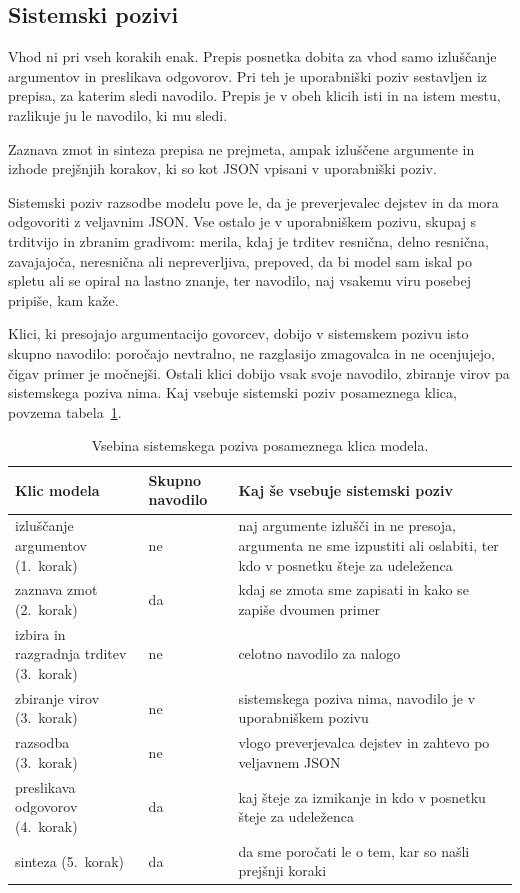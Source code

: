 \documentclass[a4paper, 12pt]{book}
\begin{document}
\subsection{Sistemski pozivi}
\label{ssec:sistemski-poziv}

Vhod ni pri vseh korakih enak. Prepis posnetka dobita za vhod samo izluščanje argumentov in preslikava odgovorov. Pri teh je uporabniški poziv sestavljen iz prepisa, za katerim sledi navodilo. Prepis je v obeh klicih isti in na istem mestu, razlikuje ju le navodilo, ki mu sledi.

Zaznava zmot in sinteza prepisa ne prejmeta, ampak izluščene argumente in izhode prejšnjih korakov, ki so kot JSON vpisani v uporabniški poziv. 

Sistemski poziv razsodbe modelu pove le, da je preverjevalec dejstev in da mora odgovoriti z veljavnim JSON. Vse ostalo je v uporabniškem pozivu, skupaj s trditvijo in zbranim gradivom: merila, kdaj je trditev resnična, delno resnična, zavajajoča, neresnična ali nepreverljiva, prepoved, da bi model sam iskal po spletu ali se opiral na lastno znanje, ter navodilo, naj vsakemu viru posebej pripiše, kam kaže.

Klici, ki presojajo argumentacijo govorcev, dobijo v sistemskem pozivu isto skupno navodilo: poročajo nevtralno, ne razglasijo zmagovalca in ne ocenjujejo, čigav primer je močnejši. Ostali klici dobijo vsak svoje navodilo, zbiranje virov pa sistemskega poziva nima. Kaj vsebuje sistemski poziv posameznega klica, povzema tabela~\ref{tbl:hisna}.

\begin{table}[H]
\centering
\small
{}
\begin{tabular}{@{}p{}p{}p{}@{}}
\toprule
Klic modela & Skupno navodilo & Kaj še vsebuje sistemski poziv \\
\midrule
izluščanje argumentov (1.~korak) & ne & naj argumente izlušči in ne presoja, argumenta ne sme izpustiti ali oslabiti, ter kdo v posnetku šteje za udeleženca \\
\midrule
zaznava zmot (2.~korak) & da & kdaj se zmota sme zapisati in kako se zapiše dvoumen primer \\
\midrule
izbira in razgradnja trditev (3.~korak) & ne & celotno navodilo za nalogo \\
\midrule
zbiranje virov (3.~korak) & ne & sistemskega poziva nima, navodilo je v uporabniškem pozivu \\
\midrule
razsodba (3.~korak) & ne & vlogo preverjevalca dejstev in zahtevo po veljavnem JSON \\
\midrule
preslikava odgovorov (4.~korak) & da & kaj šteje za izmikanje in kdo v posnetku šteje za udeleženca \\
\midrule
sinteza (5.~korak) & da & da sme poročati le o tem, kar so našli prejšnji koraki \\
\bottomrule
\end{tabular}
\caption{Vsebina sistemskega poziva posameznega klica modela.}
\label{tbl:hisna}
\end{table}
\end{document}
